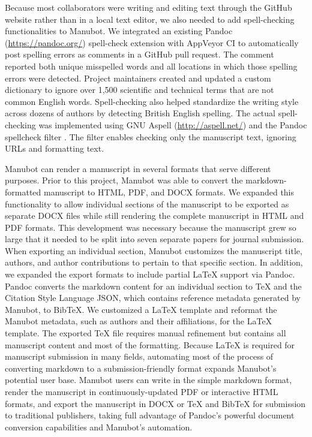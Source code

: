 \documentclass[sigconf]{acmart}
\begin{document}
Because most collaborators were writing and editing text through the GitHub website rather than in a local text editor, we also needed to add spell-checking functionalities to Manubot.
We integrated an existing Pandoc (\url{https://pandoc.org/}) spell-check extension with AppVeyor CI to automatically post spelling errors as comments in a GitHub pull request.
The comment reported both unique misspelled words and all locations in which those spelling errors were detected.
Project maintainers created and updated a custom dictionary to ignore over 1,500 scientific and technical terms that are not common English words.
Spell-checking also helped standardize the writing style across dozens of authors by detecting British English spelling.
The actual spell-checking was implemented using GNU Aspell (\url{http://aspell.net/}) and the Pandoc spellcheck filter \citep{nTjoZqSQ}.
The filter enables checking only the manuscript text, ignoring URLs and formatting text.

Manubot can render a manuscript in several formats that serve different purposes.
Prior to this project, Manubot was able to convert the markdown-formatted manuscript to HTML, PDF, and DOCX formats.
We expanded this functionality to allow individual sections of the manuscript to be exported as separate DOCX files while still rendering the complete manuscript in HTML and PDF formats.
This development was necessary because the manuscript grew so large that it needed to be split into seven separate papers for journal submission.
When exporting an individual section, Manubot customizes the manuscript title, authors, and author contributions to pertain to that specific section.
In addition, we expanded the export formats to include partial LaTeX support via Pandoc.
Pandoc converts the markdown content for an individual section to TeX and the Citation Style Language JSON, which contains reference metadata generated by Manubot, to BibTeX.
We customized a LaTeX template and reformat the Manubot metadata, such as authors and their affiliations, for the LaTeX template.
The exported TeX file requires manual refinement but contains all manuscript content and most of the formatting.
Because LaTeX is required for manuscript submission in many fields, automating most of the process of converting markdown to a submission-friendly format expands Manubot's potential user base.
Manubot users can write in the simple markdown format, render the manuscript in continuously-updated PDF or interactive HTML formats, and export the manuscript in DOCX or TeX and BibTeX for submission to traditional publishers, taking full advantage of Pandoc's powerful document conversion capabilities and Manubot's automation.
\end{document}
